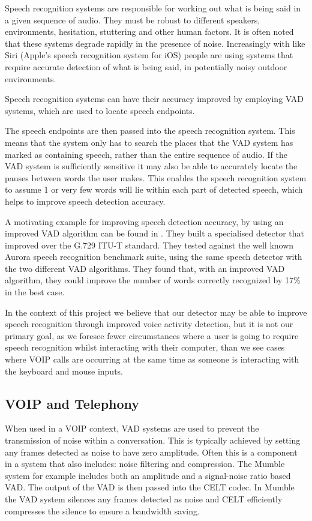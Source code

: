 \documentclass[ %
                    author={Sam Phippen},
                supervisor={Dr. Rafal Bogacz},
                     title={Real time voice activity detectors in noisy personal computing environments},
                  subtitle={},
                    degree={MEng},
                      year={2012} ]{thesis}
\begin{document}
Speech recognition systems are responsible for working out what is being said
in a given sequence of audio. They must be robust to different speakers,
environments, hesitation, stuttering and other human factors. It is often noted
that these systems degrade rapidly in the presence of noise\cite{Moreno}.
Increasingly with like Siri\texttrademark\cite{siri} (Apple's speech
recognition system for iOS\texttrademark) people are using systems that require
accurate detection of what is being said, in potentially noisy outdoor
environments.

Speech recognition systems can have their accuracy improved\cite{shin} by
employing VAD systems, which are used to locate speech endpoints. 

The speech endpoints are then passed into the speech recognition system. This
means that the system only has to search the places that the VAD system has
marked as containing speech, rather than the entire sequence of audio. If the
VAD system is sufficiently sensitive it may also be able to accurately locate
the pauses between words the user makes. This enables the speech recognition
system to assume 1 or very few words will lie within each part of detected
speech, which helps to improve speech detection accuracy.

A motivating example for improving speech detection accuracy, by using an
improved VAD algorithm can be found in \cite{ramirez-2}. They built a
specialised detector that improved over the G.729 ITU-T\cite{itut} standard.
They tested against the well known Aurora\cite{aurora} speech recognition
benchmark suite, using the same speech detector with the two different VAD
algorithms. They found that, with an improved VAD algorithm, they could
improve the number of words correctly recognized by 17\% in the best case.

In the context of this project we believe that our detector may be able to
improve speech recognition through improved voice activity detection, but it is
not our primary goal, as we foresee fewer circumstances where a user is going
to require speech recognition whilst interacting with their computer, than we
see cases where VOIP calls are occurring at the same time as someone is
interacting with the keyboard and mouse inputs.

\clearpage
\subsection{VOIP and Telephony}

When used in a VOIP context, VAD systems are used to prevent the transmission
of noise within a conversation. This is typically achieved by setting any
frames detected as noise to have zero amplitude.  Often this is a component in
a system that also includes: noise filtering and compression. The
Mumble\cite{mumble} system for example includes both an amplitude and a
signal-noise ratio based VAD. The output of the VAD is then passed into the
CELT\cite{celt} codec. In Mumble the VAD system silences any frames detected as
noise and CELT efficiently compresses the silence to ensure a bandwidth
saving.
\end{document}
